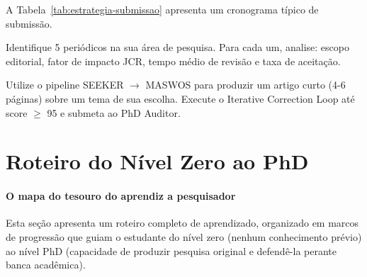 A Tabela~\ref{tab:estrategia-submissao} apresenta um cronograma típico de
submissão.

\begin{table}[htb]
\centering
    \small
\caption{Cronograma típico de submissão para periódico \qualisA{}}
\label{tab:estrategia-submissao}
\end{table}

\begin{exercicio}
    Identifique 5 periódicos \qualisA{} na sua área de pesquisa. Para cada
    um, analise: escopo editorial, fator de impacto JCR, tempo médio de
    revisão e taxa de aceitação.
\end{exercicio}

\begin{exercicio}
    Utilize o pipeline SEEKER $\rightarrow$ MASWOS para produzir um artigo
    curto (4-6 páginas) sobre um tema de sua escolha. Execute o Iterative
    Correction Loop até score $\geq$ 95 e submeta ao PhD Auditor.
\end{exercicio}

\section{Roteiro do Nível Zero ao PhD}
\label{sec:roteiro-zero-phd}
\nivelzero

\paragraph{O mapa do tesouro do aprendiz a pesquisador} Esta seção apresenta um roteiro completo de aprendizado, organizado em marcos
de progressão que guiam o estudante do nível zero (nenhum conhecimento prévio)
ao nível PhD (capacidade de produzir pesquisa original e defendê-la perante
banca acadêmica).

